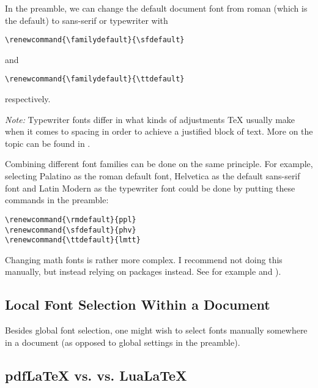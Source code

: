 \documentclass[a4paper,oneside,11pt]{article}
\newcommand\XeLaTeX{\hologo{XeLaTeX}}
\begin{document}

In the preamble, we can change the  default document font from roman (which is
the default) to sans-serif or typewriter with

\begin{verbatim}
\renewcommand{\familydefault}{\sfdefault}
\end{verbatim}
and
\begin{verbatim}
\renewcommand{\familydefault}{\ttdefault}
\end{verbatim}
respectively.

\emph{Note:} Typewriter  fonts  differ in  what  kinds  of adjustments  \TeX{}
usually make when it comes to spacing in order to achieve a justified block of
text. More on the topic can be found in \cite{texblog:typewriter}.

Combining different  font families  can be  done on  the same  principle.  For
example,  selecting Palatino  as  the  roman default  font,  Helvetica as  the
default sans-serif font and Latin Modern  as the typewriter font could be done
by putting these commands in the preamble:

\begin{verbatim}
\renewcommand{\rmdefault}{ppl}
\renewcommand{\sfdefault}{phv}
\renewcommand{\ttdefault}{lmtt}
\end{verbatim}

Changing  math  fonts is  rather  more  complex. I  recommend not  doing  this
manually,   but  instead   relying  on   packages  instead. See   for  example
\cite{stackexch:math-fonts} and \cite{practex:fonts}).


\subsection{Local Font Selection Within a Document}
\label{subsec:fontsel:local}

Besides  global  font selection,  one  might  wish  to select  fonts  manually
somewhere in a document (as opposed to global settings in the preamble).


\subsection{pdf\LaTeX{} vs. \XeLaTeX{} vs. Lua\LaTeX}
\label{subsec:fontsel:pdf:xe:lua}
\end{document}
